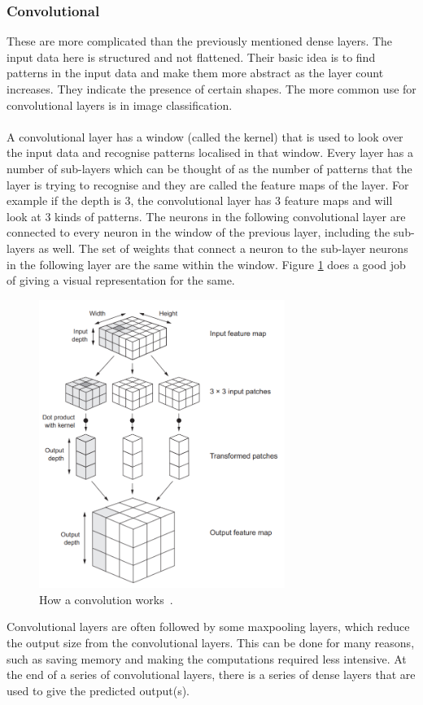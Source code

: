 \documentclass[12pt]{article}
\begin{document}
\subsubsection{Convolutional}\label{subsubsec:conv}
These are more complicated than the previously mentioned dense layers. The input data here is structured and not flattened. Their basic idea is to find patterns in the input data and make them more abstract as the layer count increases. They indicate the presence of certain shapes. The more common use for convolutional layers is in image classification.
\\\\
A convolutional layer has a window (called the kernel) that is used to look over the input data and recognise patterns localised in that window. Every layer has a number of sub-layers which can be thought of as the number of patterns that the layer is trying to recognise and they are called the feature maps of the layer. For example if the depth is 3, the convolutional layer has 3 feature maps and will look at 3 kinds of patterns. The neurons in the following convolutional layer are connected to every neuron in the window of the previous layer, including the sub-layers as well. The set of weights that connect a neuron to the sub-layer neurons in the following layer are the same within the window. Figure \ref{fig:convnet} does a good job of giving a visual representation for the same.
\begin{figure}[H]
	\centering
	\includegraphics[width=8cm]{resources/convnet.png}
	\caption{How a convolution works~\cite{deeplearning}.}%
	\label{fig:convnet}
\end{figure}
\noindent Convolutional layers are often followed by some maxpooling layers, which reduce the output size from the convolutional layers. This can be done for many reasons, such as saving memory and making the computations required less intensive. At the end of a series of convolutional layers, there is a series of dense layers that are used to give the predicted output(s). 
\clearpage
\end{document}
